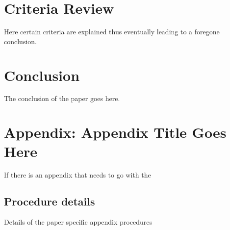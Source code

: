 \section{Criteria Review}

Here certain criteria are explained thus eventually
leading to a foregone conclusion.

\section{Conclusion}\label{Conclusion1}

The conclusion of the paper goes here.

\autocite{zieglerLecturesPolytopes1995}

\printbibliography[heading=subbibnumbered]



\section{Appendix: Appendix Title Goes Here}
If there is an appendix that needs to go with the 

\subsection{Procedure details}
Details of the paper specific appendix procedures
